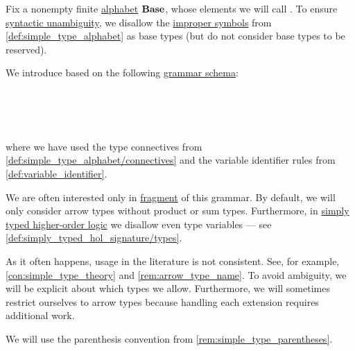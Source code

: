 \begin{definition}\label{def:simple_type}\mimprovised
  Fix a nonempty finite \hyperref[def:formal_language/alphabet]{alphabet} \( \op*{Base} \), whose elements we will call . To ensure \hyperref[def:grammar_ambiguity]{syntactic unambiguity}, we disallow the \hyperref[con:improper_symbol]{improper symbols} from \cref{def:simple_type_alphabet} as base types (but do not consider base types to be reserved).

  We introduce  based on the following \hyperref[def:formal_grammar/schema]{grammar schema}:
  \begin{bnf*}
       {} \\
         { \bnfor {}} \\
          {\bnftsq{(} \bnfsp {} \bnfsp {} \bnfsp {} \bnfsp \bnftsq{)}} \\
                { \bnfor {}}
  \end{bnf*}
  where we have used the type connectives from \cref{def:simple_type_alphabet/connectives} and the variable identifier rules from \cref{def:variable_identifier}.

  We are often interested only in \hyperref[con:syntax_fragment]{fragment} of this grammar. By default, we will only consider arrow types without product or sum types. Furthermore, in \hyperref[def:simply_typed_hol]{simply typed higher-order logic} we disallow even type variables --- see \cref{def:simply_typed_hol_signature/types}.
\end{definition}
\begin{comments}
  \item As it often happens, usage in the literature is not consistent. See, for example, \cref{con:simple_type_theory} and \cref{rem:arrow_type_name}. To avoid ambiguity, we will be explicit about which types we allow. Furthermore, we will sometimes restrict ourselves to arrow types because handling each extension requires additional work.

  \item We will use the parenthesis convention from \cref{rem:simple_type_parentheses}.
\end{comments}

